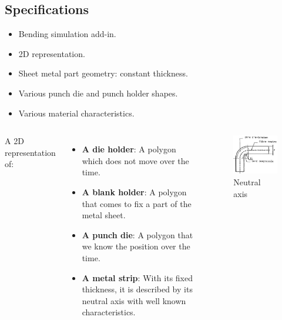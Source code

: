 \documentclass{beamer}
\begin{document}
\subsection{Specifications}
\begin{frame}
    \begin{itemize}
        \item Bending simulation add-in.
        \item 2D representation.
        \item Sheet metal part geometry: constant thickness.
        \item Various punch die and punch holder shapes.
        \item Various material characteristics.
    \end{itemize}
\end{frame}
\begin{frame}
    \begin{columns}
        A 2D representation of:
        \begin{itemize}
            \item \textbf{A die holder}: 
                A polygon which does not move over the time.
            \item \textbf{A blank holder}:
                A polygon that comes to fix a part of the metal sheet.
            \item \textbf{A punch die}:
                A polygon that we know the position over the time.
            \item \textbf{A metal strip}:
                With its fixed thickness, it is described by its neutral axis with well known characteristics.
        \end{itemize}
        \begin{figure}
            \includegraphics[width=\textwidth]{img/fibreNeutre.jpg}
            \caption{Neutral axis}
            \label{FibreNeudre}
        \end{figure}
    \end{columns}
\end{frame}
\end{document}
